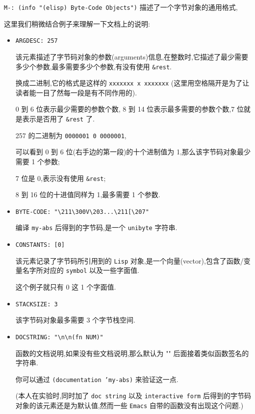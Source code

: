 \documentclass[11pt]{article}
\begin{document}
\texttt{M-: (info "(elisp) Byte-Code Objects")} 描述了一个字节对象的通用格式,

这里我们稍微结合例子来理解一下文档上的说明:

\begin{itemize}
\item \texttt{ARGDESC: 257}

该元素描述了字节码对象的参数(arguments)信息,在整数时,它描述了最少需要多少个参数,最多需要多少个参数,有没有使用 \texttt{\&rest}.

换成二进制,它的格式是这样的 \texttt{xxxxxxx x xxxxxxx} (这里用空格隔开是为了让读者能一目了然每一段是有不同作用的).

0 到 6 位表示最少需要的参数个数, 8 到 14 位表示最多需要的参数个数,7 位就是表示是否用了 \texttt{\&rest} 了.

257 的二进制为 \texttt{0000001 0 0000001},

可以看到 0 到 6 位(右手边的第一段)的十个进制值为 1,那么该字节码对象最少需要 1 个参数;

7 位是 0,表示没有使用 \texttt{\&rest};

8 到 16 位的十进值同样为 1,最多需要 1 个参数.

\item \texttt{BYTE-CODE: "\textbackslash{}211\textbackslash{}300V\textbackslash{}203...\textbackslash{}211[\textbackslash{}207"}

编译 \texttt{my-abs} 后得到的字节码,是一个 \texttt{unibyte} 字符串.

\item \texttt{CONSTANTS: [0]}

该元素记录了字节码所引用到的 \texttt{Lisp} 对象,是一个向量(vector),包含了函数/变量名字所对应的 \texttt{symbol} 以及一些字面值.

这个例子就只有 0 这 1 个字面值.

\item \texttt{STACKSIZE: 3}

该字节码对象最多需要 3 个字节栈空间.

\item \texttt{DOCSTRING: "\textbackslash{}n\textbackslash{}n(fn NUM)"}

函数的文档说明,如果没有些文档说明,那么默认为 "\n\n" 后面接着类似函数签名的字符串.

你可以通过 \texttt{(documentation 'my-abs)} 来验证这一点.

(本人在实验时,同时加了 \texttt{doc string} 以及 \texttt{interactive form} 后得到的字节码对象的该元素还是为默认值,然而一些 \texttt{Emacs} 自带的函数没有出现这个问题.)


\end{itemize}
\end{document}
